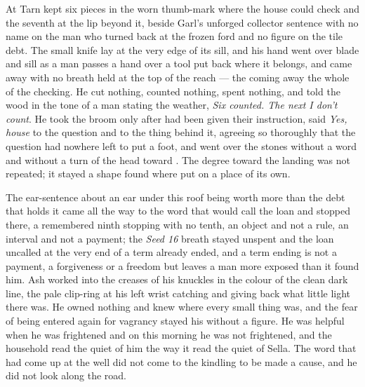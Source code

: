 At  Tarn kept six pieces in the worn thumb-mark where the house could check and the seventh at the lip beyond it, beside Garl's unforged collector sentence with no name on the man who turned back at the frozen ford and no figure on the tile debt. The small knife lay at the very edge of its sill, and his hand went over blade and sill as a man passes a hand over a tool put back where it belongs, and came away with no breath held at the top of the reach --- the coming away the whole of the checking. He cut nothing, counted nothing, spent nothing, and told the wood in the tone of a man stating the weather, \emph{Six counted. The next I don't count}. He took the broom only after  had been given their instruction, said \emph{Yes, house} to the question and to the thing behind it, agreeing so thoroughly that the question had nowhere left to put a foot, and went over the stones without a word and without a turn of the head toward . The degree toward the landing was not repeated; it stayed a shape found where put on a place of its own.

The ear-sentence about an ear under this roof being worth more than the debt that holds it came all the way to the word that would call the loan and stopped there, a remembered ninth stopping with no tenth, an object and not a rule, an interval and not a payment; the \emph{Seed 16} breath stayed unspent and the loan uncalled at the very end of a term already ended, and a term ending is not a payment, a forgiveness or a freedom but leaves a man more exposed than it found him. Ash worked into the creases of his knuckles in the colour of the clean dark line, the pale clip-ring at his left wrist catching and giving back what little light there was. He owned nothing and knew where every small thing was, and the fear of being entered again for vagrancy stayed his without a figure. He was helpful when he was frightened and on this morning he was not frightened, and the household read the quiet of him the way it read the quiet of Sella. The word that had come up at the well did not come to the kindling to be made a cause, and he did not look along the road.

